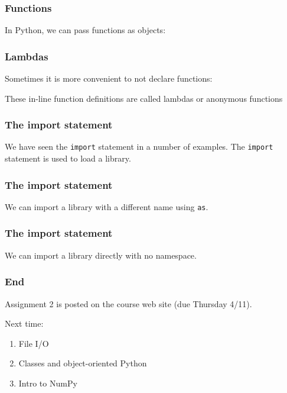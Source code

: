 \documentclass{beamer}
\begin{document}
\begin{frame}
\frametitle{Functions}
In Python, we can pass functions as objects:


\end{frame}

\begin{frame}
\frametitle{Lambdas}

Sometimes it is more convenient to not declare functions:


These in-line function definitions are called lambdas or anonymous functions
\end{frame}

\begin{frame}
\frametitle{The import statement}

We have seen the \texttt{import} statement in a number of examples.  The \texttt{import} statement is used to load a library.

\end{frame}

\begin{frame}
\frametitle{The import statement}

We can import a library with a different name using \texttt{as}.

\end{frame}

\begin{frame}
\frametitle{The import statement}

We can import a library directly with no namespace.

\end{frame}


\begin{frame}
\frametitle{End}
Assignment 2 is posted on the course web site (due Thursday 4/11).

\vspace{0.2in}

Next time:
\begin{enumerate}
\setlength{\itemsep}{0.05in}
\item{File I/O}
\item{Classes and object-oriented Python}
\item{Intro to NumPy}
\end{enumerate}

\end{frame}
\end{document}
